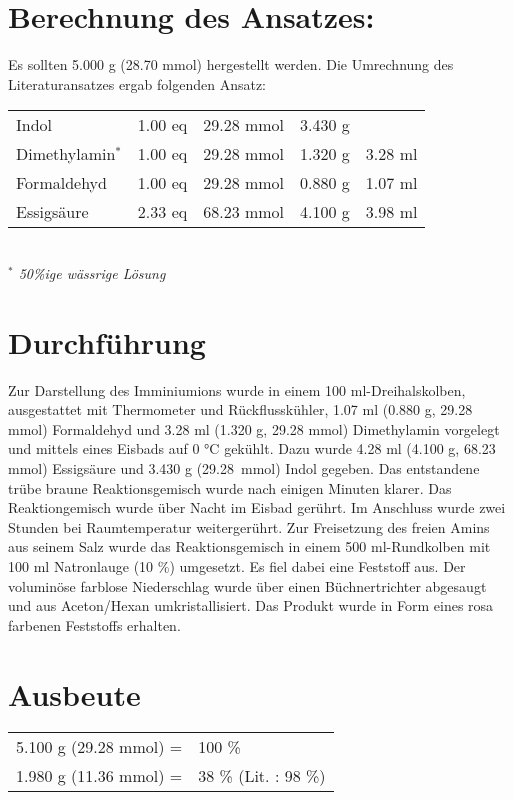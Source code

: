 \documentclass[12pt]{article}
\begin{document}
\begin{onehalfspace}
\section{Berechnung des Ansatzes: }
Es sollten 5.000 g (28.70 mmol)  hergestellt werden. Die Umrechnung des Literaturansatzes \cite{organikum} ergab folgenden Ansatz:\\[0.5cm]
\begin{tabular}{lrrrr}
Indol & 1.00 eq  & 29.28 mmol & 3.430 g & \\
Dimethylamin$^\ast$  & 1.00 eq  & 29.28 mmol &  1.320 g & 3.28 ml\\
Formaldehyd  & 1.00 eq & 29.28 mmol & 0.880 g & 1.07 ml\\
Essigsäure  & 2.33 eq  & 68.23 mmol& 4.100 g & 3.98 ml\\
\end{tabular}\\[0.5cm]
\footnotesize \textit{$^\ast$ 50\%ige wässrige Lösung}
\normalsize \section{Durchführung \cite{organikum}}
Zur Darstellung des Imminiumions wurde in einem 100 ml-Dreihalskolben, ausgestattet mit Thermometer und Rückflusskühler, 1.07 ml (0.880 g, 29.28 mmol) Formaldehyd und 3.28 ml (1.320 g, 29.28 mmol) Dimethylamin  vorgelegt und mittels eines Eisbads auf 0 \si{\celsius} gekühlt. Dazu wurde 4.28 ml (4.100 g, 68.23 mmol) Essigsäure und 3.430 g \mbox{(29.28 mmol)} Indol gegeben. Das entstandene trübe braune Reaktionsgemisch wurde nach einigen Minuten klarer. Das Reaktiongemisch wurde über Nacht im Eisbad gerührt. Im Anschluss wurde zwei Stunden bei Raumtemperatur weitergerührt. Zur Freisetzung des freien Amins aus seinem Salz wurde das Reaktionsgemisch in einem 500 ml-Rundkolben mit 100 ml Natronlauge (10 \si{\percent}) umgesetzt. Es fiel dabei eine Feststoff aus. Der voluminöse farblose Niederschlag wurde über einen Büchnertrichter abgesaugt und aus Aceton/Hexan umkristallisiert. Das Produkt wurde in Form eines rosa farbenen Feststoffs erhalten.
\section{Ausbeute}
\begin{tabular}{ rl}
  5.100 g (29.28 mmol) =  & 100 \%\\
  1.980 g (11.36 mmol) =  & 38 \% (Lit.\cite{organikum} : 98 \%) \\
 \end{tabular}

\end{onehalfspace}
\end{document}
